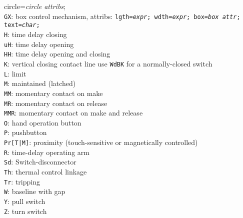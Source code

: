 {{                                         circle={\sl circle attribs};}\\
                                   {\tt GX}: box control mechanism, attribs:
                                    {\tt lgth={\sl expr}; wdth={\sl expr}; %
                                         box={\sl box attr};}%
                                    {\tt text={\sl char};}\\
                                   {\tt H}: time delay closing\\
                                   {\tt uH}: time delay opening\\
                                   {\tt HH}: time delay opening and closing\\
                                   {\tt K}: vertical closing contact line
                                     use {\tt WdBK} for a normally-closed
                                     switch\\
                                   {\tt L}: limit\\
                                   {\tt M}: maintained (latched)\\
                                   {\tt MM}: momentary contact on make\\
                                   {\tt MR}: momentary contact on release\\
                                   {\tt MMR}: momentary contact on make and
                                     release\\
                                   {\tt O}: hand operation button\\
                                   {\tt P}: pushbutton\\
                                   {\tt Pr[T|M]}: proximity (touch-sensitive or
                                       magnetically controlled)\\
                                   {\tt R}: time-delay operating arm\\
                                   {\tt Sd}: Switch-disconnector\\
                                   {\tt Th}: thermal control linkage\\
                                   {\tt Tr}: tripping\\
                                   {\tt W}: baseline with gap\\
                                   {\tt Y}: pull switch\\
                                   {\tt Z}: turn switch
   }%
